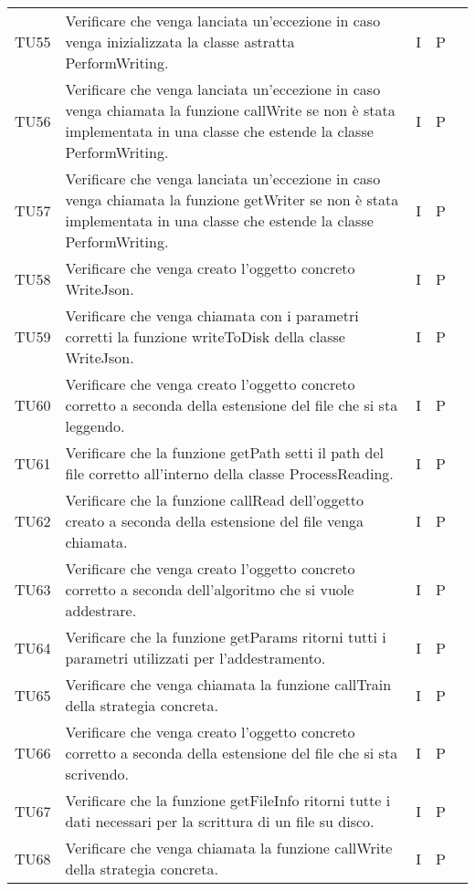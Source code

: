 \begin{longtable} {
		>{}p{15mm} 
		>{}p{79.5mm}
		>{}p{15mm} 
		>{}p{15mm}
		>{}p{0mm}}
	TU55		& Verificare che venga lanciata un'eccezione in caso venga inizializzata la classe astratta  PerformWriting.& I & P &\TBstrut \\ [2mm]
	TU56		& Verificare che venga lanciata un'eccezione in caso venga chiamata la funzione callWrite se non è stata implementata in una classe che estende la classe PerformWriting.& I & P &\TBstrut \\ [2mm]
	TU57		& Verificare che venga lanciata un'eccezione in caso venga chiamata la funzione getWriter se non è stata implementata in una classe che estende la classe PerformWriting.& I & P &\TBstrut \\ [2mm]
	TU58		& Verificare che venga creato l'oggetto concreto WriteJson.& I & P &\TBstrut \\ [2mm]
	TU59		& Verificare che venga chiamata con i parametri corretti la funzione writeToDisk della classe WriteJson.& I & P &\TBstrut \\ [2mm]
	TU60		& Verificare che venga creato l'oggetto concreto corretto a seconda della estensione del file che si sta leggendo.& I & P &\TBstrut \\ [2mm]
	TU61		& Verificare che la funzione getPath setti il path del file corretto all'interno della classe ProcessReading.& I & P &\TBstrut \\ [2mm]
	TU62		& Verificare che la funzione callRead dell'oggetto creato a seconda della estensione del file venga chiamata.& I & P &\TBstrut \\ [2mm]
	TU63		& Verificare che venga creato l'oggetto concreto corretto a seconda dell'algoritmo che si vuole addestrare.& I & P &\TBstrut \\ [2mm]
	TU64     	& Verificare che la funzione getParams ritorni tutti i parametri utilizzati per l'addestramento.& I & P &\TBstrut \\ [2mm]
	TU65		& Verificare che venga chiamata la funzione callTrain della strategia concreta.& I & P &\TBstrut \\ [2mm]
	TU66		& Verificare che venga creato l'oggetto concreto corretto a seconda della estensione del file che si sta scrivendo.& I & P &\TBstrut \\ [2mm]
	TU67		& Verificare che la funzione getFileInfo ritorni tutte i dati necessari per la scrittura di un file su disco.& I & P &\TBstrut \\ [2mm]
	TU68		& Verificare che venga chiamata la funzione callWrite della strategia concreta.& I & P &\TBstrut \\ [2mm]

\end{longtable}
